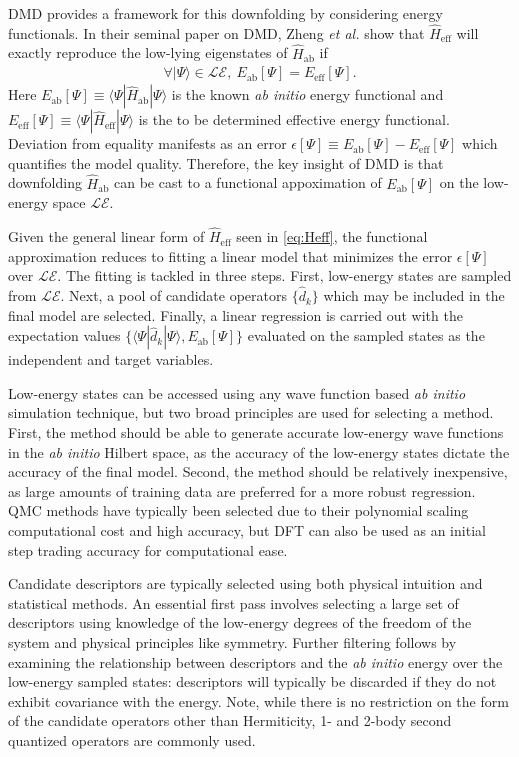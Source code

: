 \documentclass[12pt]{article}
\begin{document}
DMD provides a framework for this downfolding by considering energy functionals.
In their seminal paper on DMD, Zheng \textit{et al.} \cite{Zheng2017} show that $\hat{H}_\text{eff}$ will exactly reproduce the low-lying eigenstates of $\hat{H}_\text{ab}$ if
\begin{equation}
\begin{split}
\forall |\Psi\rangle \in \mathcal{LE},\ E_\text{ab}[\Psi] = E_\text{eff}[\Psi].
\end{split}
\label{eq:DMD}
\end{equation}
Here $E_\text{ab}[\Psi] \equiv \langle \Psi | \hat{H}_\text{ab} | \Psi \rangle$ is the known \textit{ab initio} energy functional and $E_\text{eff}[\Psi] \equiv \langle \Psi | \hat{H}_\text{eff} | \Psi \rangle$ is the to be determined effective energy functional.
Deviation from equality manifests as an error $\epsilon[\Psi] \equiv E_\text{ab}[\Psi] - E_\text{eff}[\Psi]$ which quantifies the model quality.
Therefore, the key insight of DMD is that downfolding $\hat{H}_\text{ab}$ can be cast to a functional appoximation of $E_\text{ab}[\Psi]$ on the low-energy space $\mathcal{LE}$.

Given the general linear form of $\hat{H}_\text{eff}$ seen in \eqref{eq:Heff}, 
the functional approximation reduces to fitting a linear model that minimizes the error $\epsilon[\Psi]$ over $\mathcal{LE}$.
The fitting is tackled in three steps.
First, low-energy states are sampled from $\mathcal{LE}$.
Next, a pool of candidate operators $\{\hat{d}_k\}$ which may be included in the final model are selected.
Finally, a linear regression is carried out with the expectation values $\{\langle \Psi | \hat{d}_k|\Psi \rangle, E_\text{ab}[\Psi] \}$  evaluated on the sampled states as the independent and target variables.

Low-energy states can be accessed using any wave function based \textit{ab initio} simulation technique, but two broad principles are used for selecting a method.
First, the method should be able to generate accurate low-energy wave functions in the \textit{ab initio} Hilbert space, as the accuracy of the low-energy states dictate the accuracy of the final model.
Second, the method should be relatively inexpensive, as large amounts of training data are preferred for a more robust regression.
QMC methods have typically been selected due to their polynomial scaling computational cost and high accuracy, but DFT can also be used as an initial step trading accuracy for computational ease.

Candidate descriptors are typically selected using both physical intuition and statistical methods.
An essential first pass involves selecting a large set of descriptors using knowledge of the low-energy degrees of the freedom of the system and physical principles like symmetry.
Further filtering follows by examining the relationship between descriptors and the \textit{ab initio} energy over the low-energy sampled states: descriptors will typically be discarded if they do not exhibit covariance with the energy.
Note, while there is no restriction on the form of the candidate operators other than Hermiticity, 1- and 2-body second quantized operators are commonly used.
\end{document}
